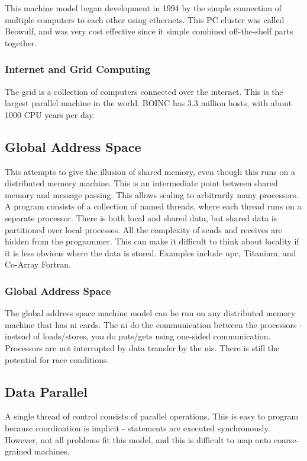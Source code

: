 \documentclass[10pt]{article}
\begin{document}
\begin{flushleft}
This machine model began development in 1994 by the simple connection of multiple computers to each other using ethernets. This PC cluster was called Beowulf, and was very cost effective since it simple combined off-the-shelf parts together. 

\subsubsection{Internet and Grid Computing}

The grid is a collection of computers connected over the internet. This is the largest parallel machine in the world. BOINC has 3.3 million hosts, with about 1000 CPU years per day. 

\subsection{Global Address Space}

This attempts to give the illusion of shared memory, even though this runs on a distributed memory machine. This is an intermediate point between shared memory and message passing. This allows scaling to arbitrarily many processors. A program consists of a collection of named threads, where each thread runs on a separate processor. There is both local and shared data, but shared data is partitioned over local processes. All the complexity of sends and receives are hidden from the programmer. This can make it difficult to think about locality if it is less obvious where the data is stored. Examples include \gls{upc}, Titanium, and Co-Array Fortran. 

\subsubsection{Global Address Space}

The global address space machine model can be run on any distributed memory machine that has \gls{ni} cards. The \gls{ni} do the communication between the processors - instead of loads/stores, you do puts/gets using one-sided communication. Processors are not interrupted by data transfer by the \gls{ni}s. There is still the potential for race conditions. 

\subsection{Data Parallel}

A single thread of control consists of parallel operations. This is easy to program because coordination is implicit - statements are executed synchronously. However, not all problems fit this model, and this is difficult to map onto coarse-grained machines.


\end{flushleft}
\end{document}
